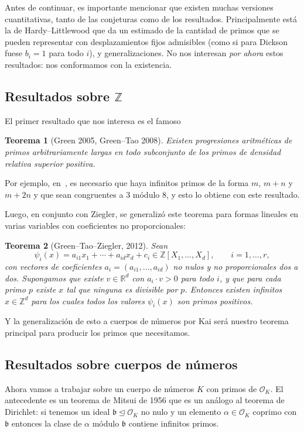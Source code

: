 \documentclass[a4paper]{book}
\theoremstyle{definition}
\theoremstyle{plain}
\newtheorem*{theorem*}{Teorema}
\newcommand{\RR}{\mathbb{R}}
\newcommand{\ZZ}{\mathbb{Z}}
\newcommand{\OO}{\mathcal{O}}
\newcommand{\bbb}{\mathfrak{b}}
\begin{document}
Antes de continuar, es importante mencionar que existen muchas versiones cuantitativas, tanto de las conjeturas como de los resultados. Principalmente está la de Hardy--Littlewood que da un estimado de la cantidad de primos que se pueden representar con desplazamientos fijos admisibles (como si para Dickson fuese $b_i=1$ para todo $i$), y generalizaciones. No nos interesan \emph{por ahora} estos resultados: nos conformamos con la existencia.

\subsection*{Resultados sobre $\ZZ$}

El primer resultado que nos interesa es el famoso
\begin{theorem*}[Green 2005, Green--Tao 2008]
Existen progresiones aritméticas de primos arbitrariamente largas en todo subconjunto de los primos de densidad relativa superior positiva. 
\end{theorem*}

Por ejemplo, en~\cite{Zywina2025RankDoesNotJump}, es necesario que haya infinitos primos de la forma $m$, $m+n$ y $m+2n$ y que sean congruentes a 3 módulo 8, y esto lo obtiene con este resultado.

Luego, en conjunto con Ziegler, se generalizó este teorema para formas lineales en varias variables con coeficientes no proporcionales: 

\begin{theorem*}[Green--Tao--Ziegler, 2012]
Sean
\[
\psi_i(x)=a_{i1}x_1+\cdots+a_{id}x_d+c_i \in\ZZ[X_1,\ldots,X_d],\qquad i=1,\ldots,r,
\]
con vectores de coeficientes $a_i=(a_{i1},\ldots,a_{id})$ no nulos y no proporcionales dos a dos. Supongamos que existe $v\in\RR^d$ con $a_i\cdot v>0$ para todo $i$, y que para cada primo $p$ existe $x$ tal que ninguna es divisible por $p$. Entonces existen infinitos $x\in\ZZ^d$ para los cuales todos los valores $\psi_i(x)$ son primos positivos.
\end{theorem*}

Y la generalización de esto a cuerpos de números por Kai será nuestro teorema principal para producir los primos que necesitamos.

\subsection*{Resultados sobre cuerpos de números}

Ahora vamos a trabajar sobre un cuerpo de números $K$ con primos de $\OO_K$. El antecedente es un teorema de Mitsui de 1956 que es un análogo al teorema de Dirichlet: si tenemos un ideal $\bbb \trianglelefteq \OO_K$ no nulo y un elemento $\alpha \in \OO_K$ coprimo con $\bbb$ entonces la clase de $\alpha$ módulo $\bbb$ contiene infinitos primos. 
\end{document}

